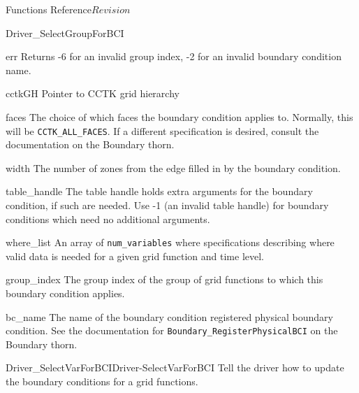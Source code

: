 \begin{cactuspart}{ Functions Reference}{}{$Revision$}
\begin{FunctionDescription}{Driver\_SelectGroupForBCI}
\begin{ResultSection}
\begin{Result}{err}
Returns -6 for an invalid group index, -2 for an invalid boundary condition name.
\end{Result}
\end{ResultSection}

\begin{ParameterSection}
\begin{Parameter}{cctkGH}
Pointer to CCTK grid hierarchy
\end{Parameter}

\begin{Parameter}{faces}
The choice of which faces the boundary condition applies to.
Normally, this will be \texttt{CCTK\_ALL\_FACES}. If a different
specification is desired, consult the documentation on the
Boundary thorn.
\end{Parameter}

\begin{Parameter}{width}
The number of zones from the edge filled in by the boundary condition.
\end{Parameter}

\begin{Parameter}{table\_handle}
The table handle holds extra arguments for the boundary condition, if such are needed. Use
-1 (an invalid table handle) for boundary conditions which need no additional arguments.
\end{Parameter}

\begin{Parameter}{where\_list}
An array of \texttt{num\_variables} where specifications describing
where valid data is needed for a given grid function and time level.
\end{Parameter}

\begin{Parameter}{group\_index}
The group index of the group of grid functions to which this boundary condition applies.
\end{Parameter}

\begin{Parameter}{bc\_name}
The name of the boundary condition registered physical boundary condition.
See the documentation for \texttt{Boundary\_RegisterPhysicalBCI} on the
Boundary thorn.
\end{Parameter}
\end{ParameterSection}

\begin{SeeAlsoSection}
\begin{SeeAlso2}{Driver\_SelectVarForBCI}{Driver-SelectVarForBCI}
Tell the driver how to update the boundary conditions for a grid functions.
\end{SeeAlso2}
\end{SeeAlsoSection}


\end{FunctionDescription}
\end{cactuspart}
